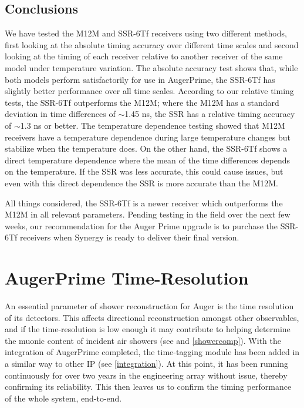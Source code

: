 \subsection{Conclusions}
We have tested the M12M and SSR-6Tf receivers using two different
methods, first looking at the absolute timing accuracy over different
time scales and second looking at the timing of each receiver relative
to another receiver of the same model under temperature variation. The
absolute accuracy test shows that, while both models perform
satisfactorily for use in AugerPrime, the SSR-6Tf has slightly better
performance over all time scales. According to our relative timing
tests, the SSR-6Tf outperforms the M12M; where the
M12M has a standard deviation in time differences of $\sim$1.45 ns, the
SSR has a relative timing accuracy of $\sim$1.3 ns or better. The
temperature dependence testing showed that M12M receivers have a
temperature dependence during large temperature changes but stabilize
when the temperature does. On the other hand, the SSR-6Tf shows a
direct temperature dependence where the mean of the time differences
depends on the temperature. If the SSR was less accurate, this could
cause issues, but even with this direct dependence the SSR is more
accurate than the M12M.

All things considered, the SSR-6Tf is a newer receiver which
outperforms the M12M in all relevant parameters. Pending testing in
the field over the next few weeks, our recommendation for the Auger
Prime upgrade is to purchase the SSR-6Tf receivers when Synergy is
ready to deliver their final version.


\section{AugerPrime Time-Resolution} %
\label{money}%
An essential parameter of shower reconstruction for Auger is the time resolution of its detectors. This affects directional reconstruction amongst other observables, and if the time-resolution is low enough it may contribute to helping determine the muonic content of incident air showers (see \textcite{mupart} and \autoref{showercomp}). With the integration of AugerPrime completed, the time-tagging module has been added in a similar way to other IP (see \autoref{integration}). At this point, it has been running continuously for over two years in the engineering array without issue, thereby confirming its reliability. This then leaves us to confirm the timing performance of the whole system, end-to-end. 

